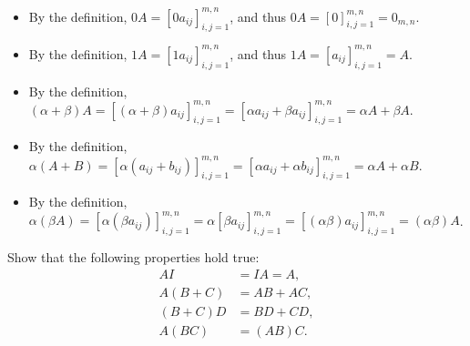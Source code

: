 \begin{solution}
\begin{itemize}
	\item By the definition, \(0A = [0 a_{ij}]_{i,j = 1}^{m, n}\), and thus \(0A = [0]_{i, j = 1}^{m, n} = 0_{m, n}\).
	\item By the definition, \(1A = [1 a_{ij}]_{i,j = 1}^{m, n}\), and thus \(1A = [a_{ij}]_{i, j = 1}^{m, n} = A\).
	\item By the definition, \((\alpha + \beta)A = [(\alpha + \beta) a_{ij}]_{i,j = 1}^{m, n} = [\alpha a_{ij} + \beta a_{ij}]_{i, j = 1}^{m, n} = \alpha A + \beta A\).
	\item By the definition, \(\alpha (A + B) = [\alpha (a_{ij} + b_{ij})]_{i,j = 1}^{m, n} = [\alpha a_{ij} + \alpha b_{ij}]_{i, j = 1}^{m, n} = \alpha A + \alpha B\).
	\item By the definition, \(\alpha (\beta A) = [\alpha (\beta a_{ij})]_{i,j = 1}^{m, n} = \alpha [\beta a_{ij}]_{i, j = 1}^{m, n} = [(\alpha \beta) a_{ij}]_{i, j = 1}^{m, n} = (\alpha \beta) A\).
\end{itemize}

\end{solution}

Show that the following properties hold true:
\begin{align*}
AI &= IA = A, \tag{neutral element}\\
A(B + C) &= AB + AC, \tag{distributivity}\\
(B + C) D &= BD + CD, \tag{distributivity}\\
A(BC) &= (AB)C. \tag{associativity}
\end{align*}

